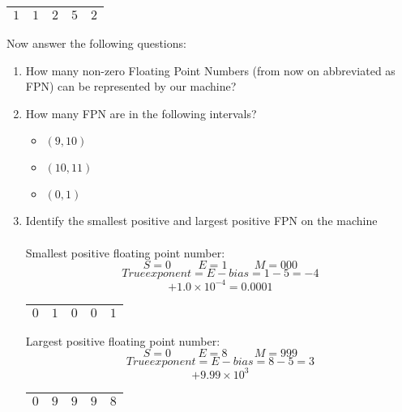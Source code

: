 \documentclass{article}
\begin{document}
\begin{enumerate}
\begin{center}
\renewcommand{\arraystretch}{1.7}
\begin{tabular}{|c|c|c|c|c|}
\hline
$1$ & $1$ & $2$ & $5$ & $2$ \\
\hline
\end{tabular}
\end{center}

Now answer the following questions:
\begin{enumerate}
\item How many non-zero Floating Point Numbers (from now on abbreviated as FPN) can be
represented by our machine?

\item How many FPN are in the following intervals?
\begin{itemize}
\item $(9, 10)$
\item $(10, 11)$
\item $(0, 1)$
\end{itemize}

\item Identify the smallest positive and largest positive FPN on the machine \\ \\
Smallest positive floating point number:
        $$S = 0 \hspace{1cm} E = 1 \hspace{1cm} M = 000$$
        $$ True exponent = E - bias = 1 - 5 = -4$$
        $$+1.0 \times 10^{-4} = 0.0001$$

\begin{center}
\renewcommand{\arraystretch}{1.7}
\begin{tabular}{|c|c|c|c|c|}
\hline
$0$ & $1$ & $0$ & $0$ & $1$ \\
\hline
\end{tabular}
\end{center}

Largest positive floating point number:
        $$S = 0 \hspace{1cm} E = 8 \hspace{1cm} M = 999$$
        $$True exponent = E - bias = 8 - 5 = 3$$
        $$+9.99 \times 10^{3}$$

\begin{center}
\renewcommand{\arraystretch}{1.7}
\begin{tabular}{|c|c|c|c|c|}
\hline
$0$ & $9$ & $9$ & $9$ & $8$ \\
\hline
\end{tabular}
\end{center}


\end{enumerate}
\end{enumerate}
\end{document}
